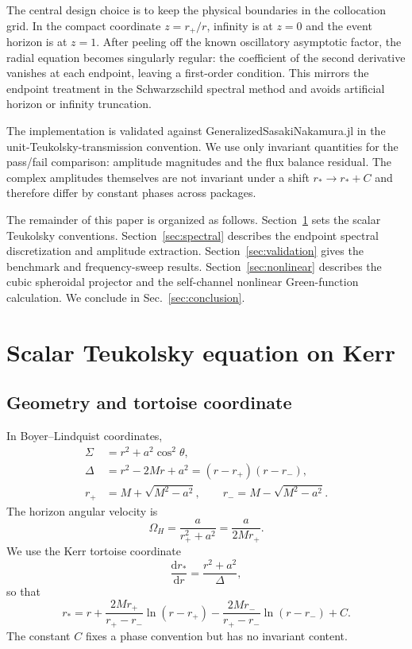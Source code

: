 \documentclass[aps,prd,twocolumn,nofootinbib,superscriptaddress,10pt]{revtex4-2}
\newcommand{\dd}{\mathrm{d}}
\newcommand{\rp}{r_+}
\newcommand{\rminus}{r_-}
\newcommand{\OmH}{\Omega_H}
\begin{document}
The central design choice is to keep the physical boundaries in the collocation
grid.  In the compact coordinate $z=\rp/r$, infinity is at $z=0$ and the event
horizon is at $z=1$.  After peeling off the known oscillatory asymptotic
factor, the radial equation becomes singularly regular: the coefficient of the
second derivative vanishes at each endpoint, leaving a first-order condition.
This mirrors the endpoint treatment in the Schwarzschild spectral method and
avoids artificial horizon or infinity truncation.

The implementation is validated against GeneralizedSasakiNakamura.jl in the
unit-Teukolsky-transmission convention.  We use only invariant quantities for
the pass/fail comparison: amplitude magnitudes and the flux balance residual.
The complex amplitudes themselves are not invariant under a shift
$r_*\rightarrow r_*+C$ and therefore differ by constant phases across packages.

The remainder of this paper is organized as follows.  Section~\ref{sec:eqs}
sets the scalar Teukolsky conventions.  Section~\ref{sec:spectral} describes
the endpoint spectral discretization and amplitude extraction.
Section~\ref{sec:validation} gives the benchmark and frequency-sweep results.
Section~\ref{sec:nonlinear} describes the cubic spheroidal projector and the
self-channel nonlinear Green-function calculation.  We conclude in
Sec.~\ref{sec:conclusion}.

\section{Scalar Teukolsky equation on Kerr}
\label{sec:eqs}

\subsection{Geometry and tortoise coordinate}

In Boyer--Lindquist coordinates,
\begin{align}
\Sigma &= r^2+a^2\cos^2\theta,\\
\Delta &= r^2-2Mr+a^2=(r-\rp)(r-\rminus),\\
\rp &= M+\sqrt{M^2-a^2},\qquad
\rminus = M-\sqrt{M^2-a^2}.
\end{align}
The horizon angular velocity is
\begin{equation}
\OmH=\frac{a}{\rp^2+a^2}=\frac{a}{2M\rp}.
\end{equation}
We use the Kerr tortoise coordinate
\begin{equation}
\frac{\dd r_*}{\dd r}=\frac{r^2+a^2}{\Delta},
\end{equation}
so that
\begin{equation}
r_*=r+\frac{2M\rp}{\rp-\rminus}\ln(r-\rp)
       -\frac{2M\rminus}{\rp-\rminus}\ln(r-\rminus)+C.
\end{equation}
The constant $C$ fixes a phase convention but has no invariant content.
\end{document}
